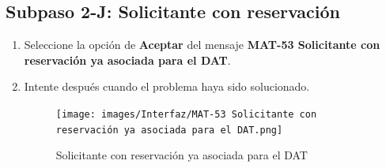 \subsection{Subpaso 2-J: Solicitante con reservación}
\begin{enumerate}
	\item Seleccione la opción de \textbf{Aceptar} del mensaje
\textbf{MAT-53 Solicitante con reservación ya asociada para el DAT}.
	\item Intente después cuando el problema haya sido
solucionado.
\begin{figure}[hbtp]
	\texttt{[image: images/Interfaz/MAT-53 Solicitante con reservación ya asociada para el DAT.png]}
	\caption{Solicitante con reservación ya asociada para el DAT}
	\end{figure}
\end{enumerate}
